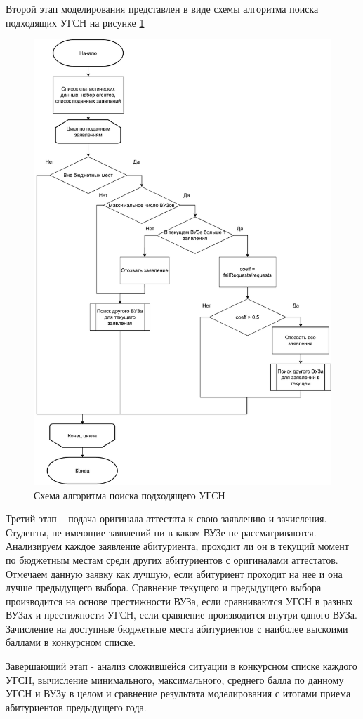 Второй этап моделирования представлен в виде схемы алгоритма поиска подходящих УГСН на рисунке \ref{scheme:find}

\begin{figure}[hbtp]
	\centering
	\includegraphics[scale=0.6]{idef0/find.pdf}
	\caption{Схема алгоритма поиска подходящего УГСН}
	\label{scheme:find}
\end{figure}


Третий этап – подача оригинала аттестата к свою заявлению и зачисления. Студенты, не имеющие заявлений ни в каком ВУЗе не рассматриваются. Анализируем каждое заявление абитуриента, проходит ли он в текущий момент по бюджетным местам среди других абитуриентов с оригиналами аттестатов. Отмечаем данную заявку как лучшую, если абитуриент проходит на нее и она лучше предыдущего выбора. Сравнение текущего и предыдущего выбора производится на основе престижности ВУЗа, если сравниваются УГСН в разных ВУЗах и престижности УГСН, если сравнение производится внутри одного ВУЗа. Зачисление на доступные бюджетные места абитуриентов с наиболее выскоими баллами в конкурсном списке.

Завершающий этап - анализ сложившейся ситуации в конкурсном списке каждого УГСН, вычисление минимального, максимального, среднего балла по данному УГСН и ВУЗу в целом и сравнение результата моделирования с итогами приема абитуриентов предыдущего года.





















\pagebreak